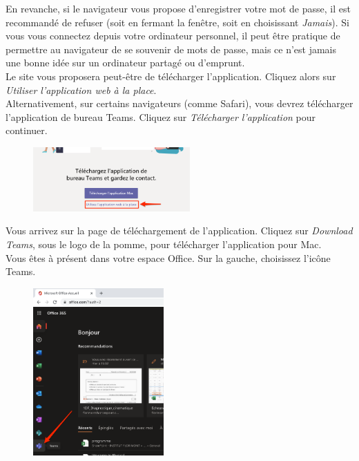 En revanche, si le navigateur vous propose d'enregistrer votre mot de passe, il est recommandé de refuser (soit en fermant la fenêtre, soit en choisissant \textit{Jamais}). Si vous vous connectez depuis votre ordinateur personnel, il peut être pratique de permettre au navigateur de se souvenir de mots de passe, mais ce n'est jamais une bonne idée sur un ordinateur partagé ou d'emprunt.\\

Le site vous proposera peut-être de télécharger l’application. Cliquez alors sur \textit{Utiliser l’application web à la place}.\\

Alternativement, sur certains navigateurs (comme Safari), vous devrez télécharger l'application de bureau Teams. Cliquez sur \textit{Télécharger l'application} pour continuer.

\begin{figure}[h]
\includegraphics[width=6cm]{./images/teams/ecran_installer_teams_crop}
\centering
\end{figure}

Vous arrivez sur la page de téléchargement de l'application. Cliquez sur \textit{Download Teams}, sous le logo de la pomme, pour télécharger l'application pour Mac.\\

Vous êtes à présent dans votre espace Office. Sur la gauche, choisissez l'icône Teams.
\newpage
\begin{figure}[h]
\includegraphics[width=5cm]{./images/teams/ecran_accueil_office_crop}
\centering
\end{figure}

